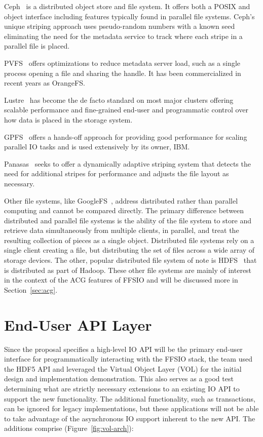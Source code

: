\documentclass[conference]{IEEEtran}
\begin{document}
Ceph~\cite{weil:ceph} is a distributed object store and file system. It offers
both a POSIX and object interface including features typically found in parallel
file systems. Ceph's unique striping approach uses pseudo-random numbers with a
known seed eliminating the need for the metadata service to track where each
stripe in a parallel file is placed.

PVFS~\cite{carns:pvfs} offers optimizations to reduce metadata server load,
such as a single process opening a file and sharing the handle. It has been
commercialized in recent years as OrangeFS.

Lustre~\cite{braam:lustre-arch} has become the de facto standard on most major
clusters offering scalable performance and fine-grained end-user and
programmatic control over how data is placed in the storage system.

GPFS~\cite{schmuck:gpfs} offers a hands-off approach for providing good
performance for scaling parallel IO tasks and is used extensively by its owner,
IBM.

Panasas~\cite{panasas:architecture} seeks to offer a dynamically adaptive
striping system that detects the need for additional stripes for performance
and adjusts the file layout as necessary.

Other file systems, like GoogleFS~\cite{ghemawat:googlefs}, address distributed
rather than parallel computing and cannot be compared directly. The primary
difference between distributed and parallel file systems is the ability of the
file system to store and retrieve data simultaneously from multiple clients, in
parallel, and treat the resulting collection of pieces as a single object.
Distributed file systems rely on a single client creating a file, but
distributing the set of files across a wide array of storage devices. The
other, popular distributed file system of note is
HDFS~\cite{Shvachko:2010:hdfs} that is distributed as part of Hadoop. These
other file systems are mainly of interest in the context of the ACG features of
FFSIO and will be discussed more in Section~\ref{sec:acg}.

\section{End-User API Layer}
\label{sec:end-user}

Since the proposal specifies a high-level IO API will be the primary end-user
interface for programmatically interacting with the FFSIO stack, the team used
the HDF5 API and leveraged the Virtual Object Layer (VOL) for the initial
design and implementation demonstration. This also serves as a good test
determining what are strictly necessary extensions to an existing IO API to
support the new functionality.  The additional functionality, such as
transactions, can be ignored for legacy implementations, but these applications
will not be able to take advantage of the asynchronous IO support inherent to
the new API.  The additions comprise (Figure~\ref{fig:vol-arch}):
\end{document}
